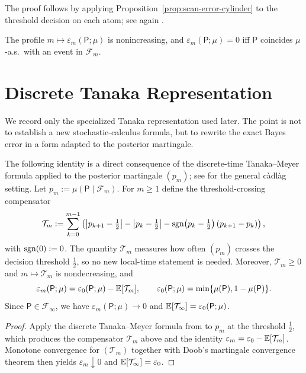 The proof follows by applying Proposition~\ref{prop:scan-error-cylinder} to the
threshold decision on each atom; see again \cite{DevroyeGyorfiLugosi1996}.

\begin{corollary}
\label{cor:basic-properties}
The profile $m\mapsto\varepsilon_m(\mathsf{P};\mu)$ is nonincreasing, and
$\varepsilon_m(\mathsf{P};\mu)=0$ iff $\mathsf{P}$ coincides $\mu$-a.s.\ with
an event in $\mathcal{F}_m$.
\end{corollary}

\section{Discrete Tanaka Representation}
\label{sec:tanaka}

We record only the specialized Tanaka representation used later.  The point is
not to establish a new stochastic-calculus formula, but to rewrite the exact
Bayes error in a form adapted to the posterior martingale.

\begin{proposition}
\label{prop:scan-tanaka}
The following identity is a direct consequence of the discrete-time
Tanaka--Meyer formula applied to the posterior martingale $(p_m)$; see
\cite{LochowskiOblojPromelSiopaes2021} for the general c\`adl\`ag setting.
Let $p_m:=\mu(\mathsf{P}\mid\mathcal{F}_m)$.  For $m\ge 1$ define the
threshold-crossing compensator
\[
\mathcal{T}_m
:=\sum_{k=0}^{m-1}
\left(
\left|p_{k+1}-\tfrac12\right|
-\left|p_k-\tfrac12\right|
-\operatorname{sgn}\!\left(p_k-\tfrac12\right)(p_{k+1}-p_k)
\right),
\]
with $\operatorname{sgn}(0):=0$.  The quantity $\mathcal{T}_m$ measures how often $(p_m)$
crosses the decision threshold $\frac12$, so no new local-time statement is
needed.  Moreover, $\mathcal{T}_m\ge 0$ and $m\mapsto \mathcal{T}_m$ is
nondecreasing, and
\[
\varepsilon_m(\mathsf{P};\mu)=\varepsilon_0(\mathsf{P};\mu)-\mathbb{E}[\mathcal{T}_m],
\qquad
\varepsilon_0(\mathsf{P};\mu)=\min\{\mu(\mathsf{P}),1-\mu(\mathsf{P})\}.
\]
Since $\mathsf{P}\in\mathcal{F}_\infty$, we have $\varepsilon_m(\mathsf{P};\mu)\to 0$
and $\mathbb{E}[\mathcal{T}_\infty]=\varepsilon_0(\mathsf{P};\mu)$.
\end{proposition}

\begin{proof}
Apply the discrete Tanaka--Meyer formula from
\cite{Tanaka1963,LochowskiOblojPromelSiopaes2021} to $p_m$ at the threshold
$\tfrac12$, which produces the compensator $\mathcal{T}_m$ above and the
identity $\varepsilon_m=\varepsilon_0-\mathbb{E}[\mathcal{T}_m]$.  Monotone
convergence for $(\mathcal{T}_m)$ together with Doob's martingale convergence
theorem then yields $\varepsilon_m\downarrow 0$ and
$\mathbb{E}[\mathcal{T}_\infty]=\varepsilon_0$.
\end{proof}

